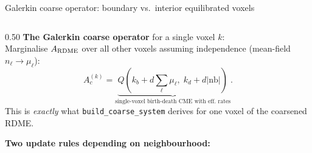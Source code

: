 \documentclass[10pt,aspectratio=169]{beamer}
\begin{document}
\begin{frame}{Galerkin coarse operator: boundary vs.\ interior equilibrated voxels}

\begin{columns}[T]
  \begin{column}{0.50\textwidth}
    \textbf{The Galerkin coarse operator} for a single voxel $k$:\\[0.3em]
    Marginalise $A_{\rm RDME}$ over all other voxels assuming independence
    (mean-field $n_\ell \to \mu_\ell$):
    \[
      A_c^{(k)} = \underbrace{Q(k_b {+} d\textstyle\sum_\ell\mu_\ell,\; k_d {+} d|\text{nb}|)}_{
        \text{single-voxel birth-death CME with eff.\ rates}}.
    \]
    This is \emph{exactly} what \texttt{build\_coarse\_system} derives
    for one voxel of the coarsened RDME.

    \bigskip
    \textbf{Two update rules depending on neighbourhood:}


\end{column}
\end{columns}
\end{frame}
\end{document}
